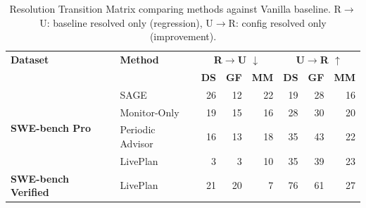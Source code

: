 \begin{table}[t]
\centering
\small
\caption{Resolution Transition Matrix comparing methods against Vanilla baseline. R$\rightarrow$U: baseline resolved only (regression), U$\rightarrow$R: config resolved only (improvement).}
\label{tab:ru_transition}
\begin{tabular}{@{}llrrrrrr@{}}
\toprule
\textbf{Dataset} & \textbf{Method} & \multicolumn{3}{c}{\textbf{R$\rightarrow$U $\downarrow$}} & \multicolumn{3}{c}{\textbf{U$\rightarrow$R $\uparrow$}} \\
 &  & \textbf{DS} & \textbf{GF} & \textbf{MM} & \textbf{DS} & \textbf{GF} & \textbf{MM} \\
\midrule
\multirow{4}{*}{\textbf{SWE-bench Pro}} & SAGE & 26 & 12 & 22 & 19 & 28 & 16 \\
 & Monitor-Only & 19 & 15 & 16 & 28 & 30 & 20 \\
 & Periodic Advisor & 16 & 13 & 18 & 35 & 43 & 22 \\
 & LivePlan & 3 & 3 & 10 & 35 & 39 & 23 \\
\midrule
\multirow{1}{*}{\textbf{SWE-bench Verified}} & LivePlan & 21 & 20 & 7 & 76 & 61 & 27 \\
\bottomrule
\end{tabular}
\end{table}